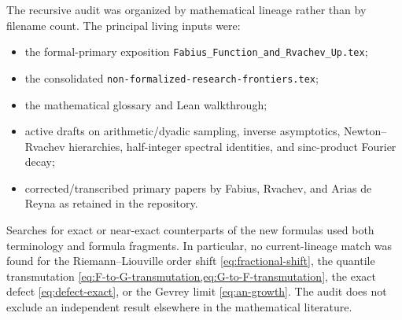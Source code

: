 \documentclass[11pt]{article}
\theoremstyle{definition}
\theoremstyle{remark}
\begin{document}
The recursive audit was organized by mathematical lineage rather than by filename count.
The principal living inputs were:
\begin{itemize}
\item the formal-primary exposition \texttt{Fabius\_Function\_and\_Rvachev\_Up.tex};
\item the consolidated \texttt{non-formalized-research-frontiers.tex};
\item the mathematical glossary and Lean walkthrough;
\item active drafts on arithmetic/dyadic sampling, inverse asymptotics, Newton--Rvachev
      hierarchies, half-integer spectral identities, and sinc-product Fourier decay;
\item corrected/transcribed primary papers by Fabius, Rvachev, and Arias de Reyna as retained
      in the repository.
\end{itemize}

Searches for exact or near-exact counterparts of the new formulas used both terminology and
formula fragments.  In particular, no current-lineage match was found for the
Riemann--Liouville order shift \cref{eq:fractional-shift}, the quantile transmutation
\cref{eq:F-to-G-transmutation,eq:G-to-F-transmutation}, the exact defect
\cref{eq:defect-exact}, or the Gevrey limit \cref{eq:an-growth}.  The audit does not exclude an
independent result elsewhere in the mathematical literature.
\end{document}
